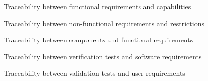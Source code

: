 \documentclass[a4paper,10pt]{article}
\begin{document}
  \begin{figure}[htbp]
    \centering
    \traceabilityFNCA
    \caption{Traceability between functional requirements and capabilities}
  \end{figure}

  \begin{figure}[htbp]
    \centering
    \traceabilityNFRE
    \caption{Traceability between non-functional requirements and restrictions}
  \end{figure}

  \begin{figure}[htbp]
    \centering
    \traceabilityCompFN
    \caption{Traceability between components and functional requirements}
  \end{figure}

  \begin{figure}[htbp]
    \centering
    \traceabilityVETSR
    \caption{Traceability between verification tests and software requirements}
  \end{figure}

  \begin{figure}[htbp]
    \centering
    \traceabilityVATUR
    \caption{Traceability between validation tests and user requirements}
  \end{figure}
\end{document}
